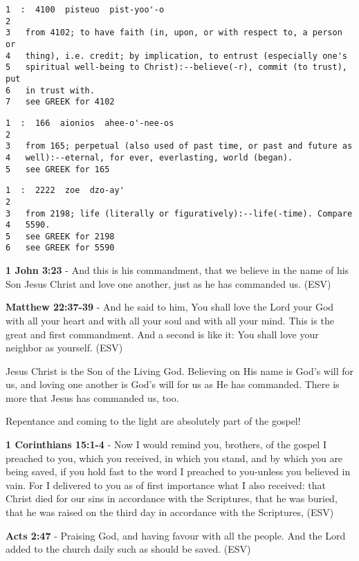 \documentclass[11pt]{article}
\begin{document}
\begin{verbatim}
1  :  4100  pisteuo  pist-yoo'-o
2  
3   from 4102; to have faith (in, upon, or with respect to, a person or
4   thing), i.e. credit; by implication, to entrust (especially one's
5   spiritual well-being to Christ):--believe(-r), commit (to trust), put
6   in trust with.
7   see GREEK for 4102
\end{verbatim}

\begin{verbatim}
1  :  166  aionios  ahee-o'-nee-os
2  
3   from 165; perpetual (also used of past time, or past and future as
4   well):--eternal, for ever, everlasting, world (began).
5   see GREEK for 165
\end{verbatim}

\begin{verbatim}
1  :  2222  zoe  dzo-ay'
2  
3   from 2198; life (literally or figuratively):--life(-time). Compare
4   5590.
5   see GREEK for 2198
6   see GREEK for 5590
\end{verbatim}

\textbf{1 John 3:23} - And this is his commandment, that we believe in the name of his Son Jesus Christ and love one another, just as he has commanded us. (ESV)

\textbf{Matthew 22:37-39} - And he said to him, You shall love the Lord your God with all your heart and with all your soul and with all your mind. This is the great and first commandment. And a second is like it: You shall love your neighbor as yourself. (ESV)

Jesus Christ is the Son of the Living God. Believing on His name is God's will for us, and loving one another is God's will for us as He has commanded. There is more that Jesus has commanded us, too.

Repentance and coming to the light are absolutely part of the gospel!

\textbf{1 Corinthians 15:1-4} -  Now I would remind you, brothers, of the gospel I preached to you, which you received, in which you stand, and by which you are being saved, if you hold fast to the word I preached to you-unless you believed in vain.  For I delivered to you as of first importance what I also received: that Christ died for our sins in accordance with the Scriptures, that he was buried, that he was raised on the third day in accordance with the Scriptures,  (ESV)

\textbf{Acts 2:47} - Praising God, and having favour with all the people. And the Lord added to the church daily such as should be saved. (ESV)
\end{document}
